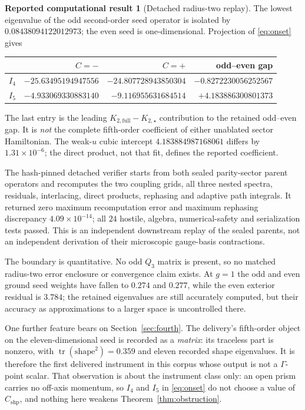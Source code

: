 \documentclass[11pt]{article}
\theoremstyle{plain}
\theoremstyle{definition}
\newtheorem{reported}[theorem]{Reported computational result}
\theoremstyle{remark}
\newcommand{\chk}[1]{}
\begin{document}
\begin{reported}[Detached radius-two replay]\label{rep:replay}
The lowest eigenvalue of the odd second-order seed operator is isolated by
$0.08438094122012973$; the even seed is one-dimensional. Projection of
\eqref{eq:onset} gives
\begin{center}\small
\begin{tabular}{lrrr}
\toprule
 & $C=-$ & $C=+$ & odd--even gap\\
\midrule
$I_4$ & $-25.63495194947556$ & $-24.807728943850304$ & $-0.8272230056252567$\\
$I_5$ & $-4.933069330883140$ & $-9.116955631684514$ & $+4.183886300801373$\\
\bottomrule
\end{tabular}
\end{center}
The last entry is the leading $K_{2,\mathrm{full}}-K_{2,\star}$ contribution
to the retained odd--even gap. It is \emph{not} the complete fifth-order
coefficient of either unablated sector Hamiltonian. The weak-$u$ cubic
intercept $4.183884987168061$ differs by $1.31\times10^{-6}$; the direct
product, not that fit, defines the reported coefficient.
\end{reported}
\chk{the sealed radius-two report passes its six float checks at stated tolerances}

The hash-pinned detached verifier starts from both sealed parity-sector parent
operators and recomputes the two coupling grids, all three nested spectra,
residuals, interlacing, direct products, rephasing and adaptive path
integrals. It returned zero maximum recomputation error and maximum rephasing
discrepancy $4.09\times10^{-14}$; all $24$ hostile, algebra, numerical-safety
and serialization tests passed. This is an independent downstream replay of
the sealed parents, not an independent derivation of their microscopic
gauge-basis contractions.

The boundary is quantitative. No odd $Q_3$ matrix is present, so no matched
radius-two error enclosure or convergence claim exists. At $g=1$ the odd and
even ground seed weights have fallen to $0.274$ and $0.277$, while the even
exterior residual is $3.784$; the retained eigenvalues are still accurately
computed, but their accuracy as approximations to a larger space is
uncontrolled there.

One further feature bears on Section~\ref{sec:fourth}. The delivery's
fifth-order object on the eleven-dimensional seed is recorded as a
\emph{matrix}: its traceless part is nonzero, with
$\operatorname{tr}(\mathrm{shape}^2)=0.359$ and eleven recorded shape
eigenvalues. It is therefore the first delivered instrument in this corpus
whose output is not a $\Gamma$-point scalar. That observation is about the
instrument class only: an open prism carries no off-axis momentum, so $I_4$
and $I_5$ in \eqref{eq:onset} do not choose a value of $C_{\mathrm{shp}}$, and
nothing here weakens Theorem~\ref{thm:obstruction}.
\chk{the sealed radius-two report passes its six float checks at stated tolerances}
\end{document}
